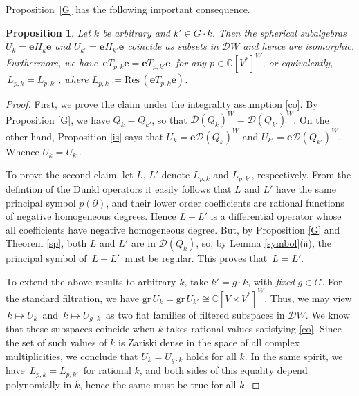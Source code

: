 \documentclass{amsart}
\newtheorem{prop}[theorem]{Proposition}
\theoremstyle{definition}
\theoremstyle{remark}
\numberwithin{equation}{section}
\begin{document}
\medskip

Proposition~\ref{G} has the following important consequence.

\begin{prop}\label{shift1} Let $k$ be arbitrary and $k'\in G\cdot k$.
Then the  sphe\-ri\-cal subalgebras $U_k={\boldsymbol{e}} H_k{\boldsymbol{e}}$ and
$U_{k'}={\boldsymbol{e}} H_{k'}{\boldsymbol{e}}$ coincide as subsets in ${\mathcal{D}} W$ and hence are
isomorphic. Furthermore, we have $\,{\boldsymbol{e}} T_{p,k}{\boldsymbol{e}}={\boldsymbol{e}} T_{p,k'}{\boldsymbol{e}}\,$ for
any $p\in{\mathbb{C}}[V^*]^W$, or equivalently, $\,L_{p, k}=L_{p, k'}\,$, where
$L_{p,k}:={\mathrm{Res}}\,({\boldsymbol{e}} T_{p,k}{\boldsymbol{e}})$.
\end{prop}

\begin{proof} First, we prove the claim under the integrality
assumption \eqref{co}. By Proposition \ref{G}, we have $Q_k=Q_{k'}$,
so that ${\mathcal{D}}(Q_k)^W={\mathcal{D}}(Q_{k'})^W$. On the other hand, Proposition \ref{is}
says that $U_k={\boldsymbol{e}}{\mathcal{D}}(Q_k)^W$ and $U_{k'}={\boldsymbol{e}}{\mathcal{D}}(Q_{k'})^W$. Whence $U_k=U_{k'}$.

To prove the second claim, let $L,\,L'$ denote $L_{p, k}$ and $L_{p,
k'}$, respectively. From the defintion of the Dunkl operators it
easily follows that $L$ and $L'$ have the same principal symbol
$p(\partial)$, and their lower order coefficients are rational
functions of negative homogeneous degrees. Hence $ L - L' $ is a
differential operator whose all coefficients have negative
homogeneous degree. But, by Proposition \ref{G} and Theorem
\ref{sp}, both $L$ and $ L'$ are in $\mathcal D(Q_k)$, so, by Lemma
\ref{symbol}($\mathsf{ii}$), the principal symbol of $\, L - L' \,$
must be regular. This proves that $\,L=L'$.

To extend the above results to arbitrary $k$, take $k'=g\cdot k$,
with {\it fixed} $g\in G$. For the standard filtration, we have
${\mathrm{gr}}\, U_k ={\mathrm{gr}}\, U_{k'} \cong {\mathbb{C}}[V\times V^*]^W$. Thus, we may view
$\,k\mapsto U_k\,$ and $\,k\mapsto U_{g\cdot k}\,$ as two flat
families of filtered subspaces in ${\mathcal{D}} W$. We know that these
subspaces coincide when $k$ takes rational values satisfying
\eqref{co}. Since the set of such values of $k$ is Zariski dense in
the space of all complex multiplicities, we conclude that
$U_k=U_{g\cdot k}$ holds for all $k$. In the same spirit, we have
$\,L_{p,k}=L_{p,k'}\,$ for rational $k$, and both sides of this
equality depend polynomially in $k$, hence the same must be true for
all $k$.
\end{proof}
\end{document}
